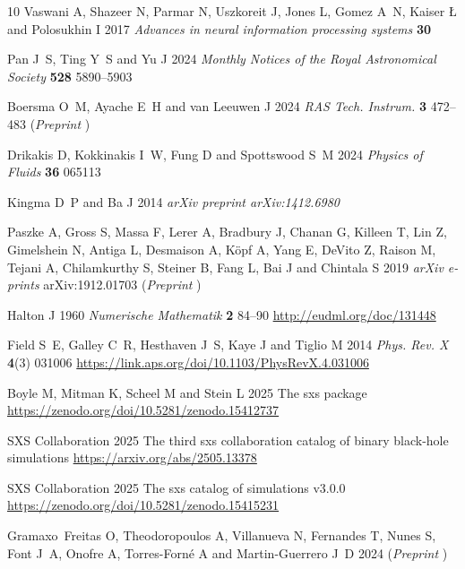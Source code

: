 \documentclass[12pt]{iopart}
\begin{document}
\begin{thebibliography}{10}
Vaswani A, Shazeer N, Parmar N, Uszkoreit J, Jones L, Gomez A~N, Kaiser {\L}
  and Polosukhin I 2017 {\em Advances in neural information processing
  systems\/} {\bf 30}

Pan J~S, Ting Y~S and Yu J 2024 {\em Monthly Notices of the Royal Astronomical
  Society\/} {\bf 528} 5890--5903

Boersma O~M, Ayache E~H and van Leeuwen J 2024 {\em RAS Tech. Instrum.\/} {\bf
  3} 472--483 (\textit{Preprint} )

Drikakis D, Kokkinakis I~W, Fung D and Spottswood S~M 2024 {\em Physics of
  Fluids\/} {\bf 36} 065113

Kingma D~P and Ba J 2014 {\em arXiv preprint arXiv:1412.6980\/}

{Paszke} A, {Gross} S, {Massa} F, {Lerer} A, {Bradbury} J, {Chanan} G,
  {Killeen} T, {Lin} Z, {Gimelshein} N, {Antiga} L, {Desmaison} A, {K{\"o}pf}
  A, {Yang} E, {DeVito} Z, {Raison} M, {Tejani} A, {Chilamkurthy} S, {Steiner}
  B, {Fang} L, {Bai} J and {Chintala} S 2019 {\em arXiv e-prints\/}
  arXiv:1912.01703 (\textit{Preprint} )

Halton J 1960 {\em Numerische Mathematik\/} {\bf 2} 84--90
  \urlprefix\url{http://eudml.org/doc/131448}

Field S~E, Galley C~R, Hesthaven J~S, Kaye J and Tiglio M 2014 {\em Phys. Rev.
  X\/} {\bf 4}(3) 031006
  \urlprefix\url{https://link.aps.org/doi/10.1103/PhysRevX.4.031006}

Boyle M, Mitman K, Scheel M and Stein L 2025 The sxs package
  \urlprefix\url{https://zenodo.org/doi/10.5281/zenodo.15412737}

{SXS Collaboration} 2025 The third sxs collaboration catalog of binary
  black-hole simulations \urlprefix\url{https://arxiv.org/abs/2505.13378}

{SXS Collaboration} 2025 The sxs catalog of simulations v3.0.0
  \urlprefix\url{https://zenodo.org/doi/10.5281/zenodo.15415231}

Gramaxo~Freitas O, Theodoropoulos A, Villanueva N, Fernandes T, Nunes S, Font
  J~A, Onofre A, Torres-Forn\'e A and Martin-Guerrero J~D 2024
  (\textit{Preprint} )


\end{thebibliography}
\end{document}
